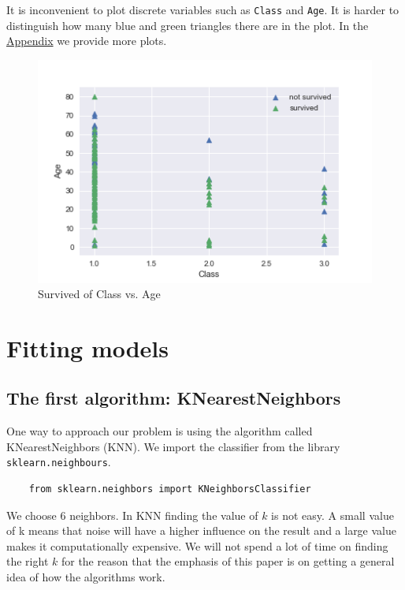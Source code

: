 \documentclass[11pt]{article}
\begin{document}
It is inconvenient to plot discrete variables such as \texttt{Class} and \texttt{Age}. It is harder to distinguish how many blue and green triangles there are in the plot. In the \hyperref[sec:appendix]{Appendix} we provide more plots. 


\begin{figure}[htbp]
\centering
\includegraphics[width=.9\linewidth]{./survclass.png}
\caption{\label{fig:survclas}
Survived of Class vs. Age}
\end{figure}



\newpage

\section{Fitting models}
\label{sec:org891a5e8}
\subsection{The first algorithm: KNearestNeighbors}
\label{sec:org5ca911f}

One way to approach our problem is using the algorithm called KNearestNeighbors (KNN). We import the classifier from the library \texttt{sklearn.neighbours}. 

\begin{verbatim}
    from sklearn.neighbors import KNeighborsClassifier
\end{verbatim}

We choose 6 neighbors. In KNN finding the value of \(k\) is not easy. A small value of k means that noise will have a higher influence on the result and a large value makes it computationally expensive. We will not spend a lot of time on finding the right \(k\) for the reason that the emphasis of this paper is on getting a general idea of how the algorithms work. 
\end{document}
